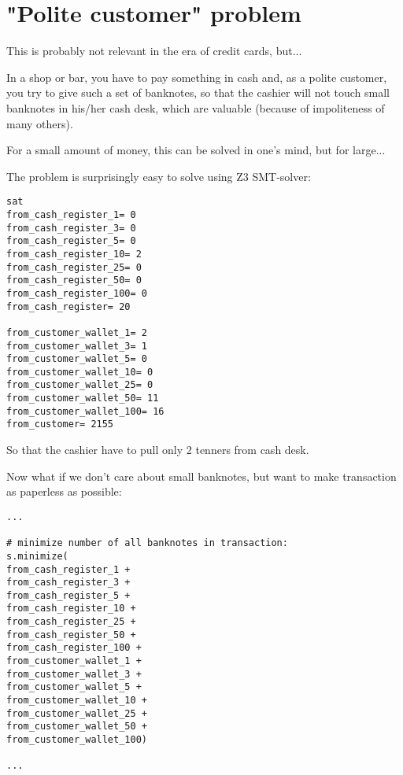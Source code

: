 \section{"Polite customer" problem}

This is probably not relevant in the era of credit cards, but...

In a shop or bar, you have to pay something in cash and, as a polite customer, you try to give such a set of banknotes,
so that the cashier will not touch small banknotes in his/her cash desk, which are valuable (because of
impoliteness of many others).

For a small amount of money, this can be solved in one's mind, but for large...

The problem is surprisingly easy to solve using Z3 SMT-solver:



\begin{lstlisting}
sat                                                                                                                               
from_cash_register_1= 0
from_cash_register_3= 0
from_cash_register_5= 0
from_cash_register_10= 2
from_cash_register_25= 0
from_cash_register_50= 0
from_cash_register_100= 0
from_cash_register= 20

from_customer_wallet_1= 2
from_customer_wallet_3= 1
from_customer_wallet_5= 0
from_customer_wallet_10= 0
from_customer_wallet_25= 0
from_customer_wallet_50= 11
from_customer_wallet_100= 16
from_customer= 2155
\end{lstlisting}

So that the cashier have to pull only 2 tenners from cash desk.

\myhrule{}

Now what if we don't care about small banknotes, but want to make transaction as paperless as possible:

\begin{lstlisting}[style=custompy]
...

# minimize number of all banknotes in transaction:
s.minimize(
from_cash_register_1 + 
from_cash_register_3 + 
from_cash_register_5 + 
from_cash_register_10 + 
from_cash_register_25 + 
from_cash_register_50 + 
from_cash_register_100 +
from_customer_wallet_1 +
from_customer_wallet_3 +
from_customer_wallet_5 +
from_customer_wallet_10 +
from_customer_wallet_25 +
from_customer_wallet_50 +
from_customer_wallet_100)

...
\end{lstlisting}

